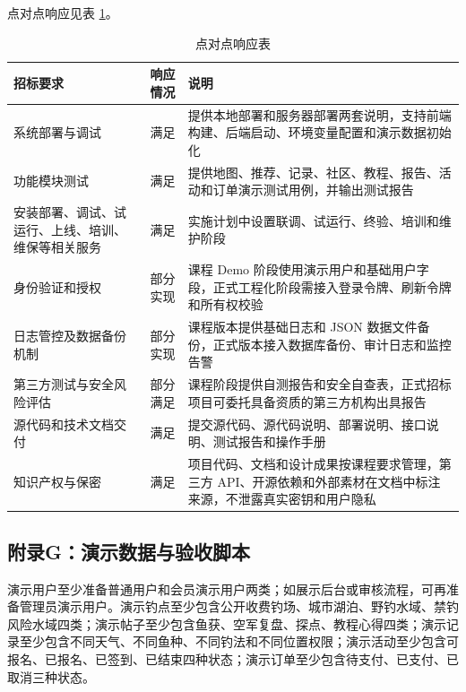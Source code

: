 点对点响应见表 \ref{tab:point-to-point}。

\begin{table}[htbp]
  \captionsetup{justification=raggedright,singlelinecheck=false}
  \small
  \caption{点对点响应表}
  \label{tab:point-to-point}
  \begin{tabularx}{\textwidth}{>{\raggedright\arraybackslash}p{3.2cm}|>{\raggedright\arraybackslash}p{1.5cm}|X}
    \toprule
    \textbf{招标要求} & \textbf{响应情况} & \textbf{说明} \\
    \midrule
    系统部署与调试 & 满足 & 提供本地部署和服务器部署两套说明，支持前端构建、后端启动、环境变量配置和演示数据初始化 \\
    \hline
    功能模块测试 & 满足 & 提供地图、推荐、记录、社区、教程、报告、活动和订单演示测试用例，并输出测试报告 \\
    \hline
    安装部署、调试、试运行、上线、培训、维保等相关服务 & 满足 & 实施计划中设置联调、试运行、终验、培训和维护阶段 \\
    \hline
    身份验证和授权 & 部分实现 & 课程 Demo 阶段使用演示用户和基础用户字段，正式工程化阶段需接入登录令牌、刷新令牌和所有权校验 \\
    \hline
    日志管控及数据备份机制 & 部分实现 & 课程版本提供基础日志和 JSON 数据文件备份，正式版本接入数据库备份、审计日志和监控告警 \\
    \hline
    第三方测试与安全风险评估 & 部分满足 & 课程阶段提供自测报告和安全自查表，正式招标项目可委托具备资质的第三方机构出具报告 \\
    \hline
    源代码和技术文档交付 & 满足 & 提交源代码、源代码说明、部署说明、接口说明、测试报告和操作手册 \\
    \hline
    知识产权与保密 & 满足 & 项目代码、文档和设计成果按课程要求管理，第三方 API、开源依赖和外部素材在文档中标注来源，不泄露真实密钥和用户隐私 \\
    \bottomrule
  \end{tabularx}
\end{table}

\subsection{附录G：演示数据与验收脚本}

演示用户至少准备普通用户和会员演示用户两类；如展示后台或审核流程，可再准备管理员演示用户。演示钓点至少包含公开收费钓场、城市湖泊、野钓水域、禁钓风险水域四类；演示帖子至少包含鱼获、空军复盘、探点、教程心得四类；演示记录至少包含不同天气、不同鱼种、不同钓法和不同位置权限；演示活动至少包含可报名、已报名、已签到、已结束四种状态；演示订单至少包含待支付、已支付、已取消三种状态。

